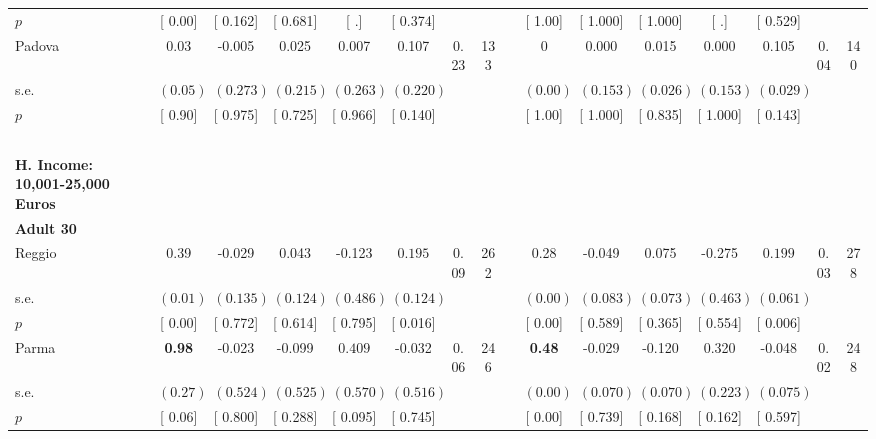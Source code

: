 \begin{longtable}{L{8em} c c c c c c c p{1em} c c c c c c c}
\quad \quad \quad \quad $ p$ & [     0.00] & [    0.162] & [    0.681] & [        .] & [    0.374] & & & & [     1.00] & [    1.000] & [    1.000] & [        .] & [    0.529] & &  \\[1em]
\quad \quad \quad Padova& 0.03 &    -0.005 &     0.025 &     0.007 &     0.107 &      0.23 &       133 & & 0 &     0.000 &     0.015 &     0.000 &     0.105 &      0.04 &       140  \\*
\quad \quad \quad \quad s.e.& $ (     0.05)$ & $ (    0.273)$ & $ (    0.215)$ & $ (    0.263)$ & $ (    0.220)$ & & & & $ (     0.00)$ & $ (    0.153)$ & $ (    0.026)$ & $ (    0.153)$ & $ (    0.029)$ & &  \\*
\quad \quad \quad \quad $ p$ & [     0.90] & [    0.975] & [    0.725] & [    0.966] & [    0.140] & & & & [     1.00] & [    1.000] & [    0.835] & [    1.000] & [    0.143] & &  \\[1em]
~\\[1em]
\textbf{H. Income: 10,001-25,000 Euros} \\*
\quad \quad \textbf{Adult 30} & & & & & & & & & & & & & & & \\* 
\quad \quad \quad Reggio& 0.39 &    -0.029 &     0.043 &    -0.123 & $ \mathbf{    0.195}$ &      0.09 &       262 & & 0.28 &    -0.049 &     0.075 &    -0.275 & $ \mathbf{    0.199}$ &      0.03 &       278  \\*
\quad \quad \quad \quad s.e.& $ (     0.01)$ & $ (    0.135)$ & $ (    0.124)$ & $ (    0.486)$ & $ (    0.124)$ & & & & $ (     0.00)$ & $ (    0.083)$ & $ (    0.073)$ & $ (    0.463)$ & $ (    0.061)$ & &  \\*
\quad \quad \quad \quad $ p$ & [     0.00] & [    0.772] & [    0.614] & [    0.795] & [    0.016] & & & & [     0.00] & [    0.589] & [    0.365] & [    0.554] & [    0.006] & &  \\[1em]
\quad \quad \quad Parma& \textbf{     0.98} &    -0.023 &    -0.099 & $ \mathbf{    0.409}$ &    -0.032 &      0.06 &       246 & & \textbf{     0.48} &    -0.029 &    -0.120 &     0.320 &    -0.048 &      0.02 &       248  \\*
\quad \quad \quad \quad s.e.& $ (     0.27)$ & $ (    0.524)$ & $ (    0.525)$ & $ (    0.570)$ & $ (    0.516)$ & & & & $ (     0.00)$ & $ (    0.070)$ & $ (    0.070)$ & $ (    0.223)$ & $ (    0.075)$ & &  \\*
\quad \quad \quad \quad $ p$ & [     0.06] & [    0.800] & [    0.288] & [    0.095] & [    0.745] & & & & [     0.00] & [    0.739] & [    0.168] & [    0.162] & [    0.597] & &  \\[1em]

\end{longtable}
